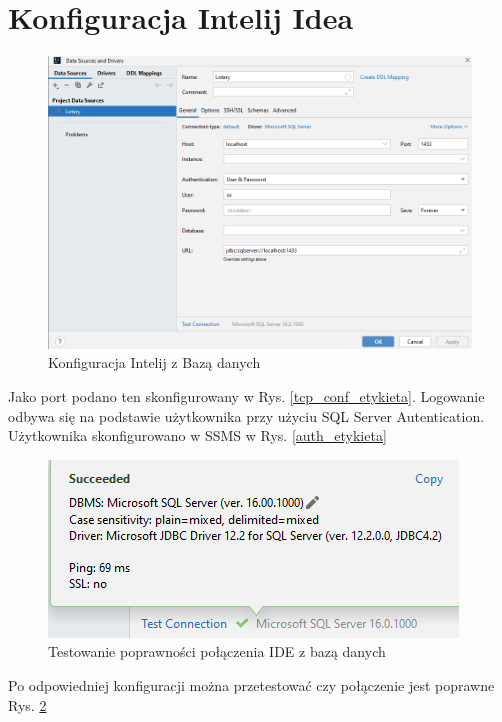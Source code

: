 \section{Konfiguracja Intelij Idea}


\begin{figure}[h]
    \includegraphics[scale=0.6]{rys05/intelij_config_database.png}
    \caption{Konfiguracja Intelij z Bazą danych}
    \label{intelij_db_config_etykieta}
\end{figure}

Jako port podano ten skonfigurowany w Rys. \ref{tcp_conf_etykieta}. Logowanie odbywa się na podstawie użytkownika przy użyciu SQL Server Autentication. Użytkownika skonfigurowano w SSMS w Rys. \ref{auth_etykieta} 


\newpage

\begin{figure}[h]
		\centering
    \includegraphics[scale=1.0]{rys05/test_connection.png}
    \caption{Testowanie poprawności połączenia IDE z bazą danych}
    \label{test_connection_etykieta}
\end{figure}

Po odpowiedniej konfiguracji można przetestować czy połączenie jest poprawne Rys. \ref{test_connection_etykieta}

